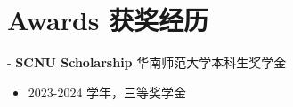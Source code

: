 \section*{ Awards 获奖经历}

- \textbf{SCNU Scholarship} 华南师范大学本科生奖学金
  \begin{itemize}[leftmargin=1.5em]
    \item 2023-2024 学年，三等奖学金
  \end{itemize}